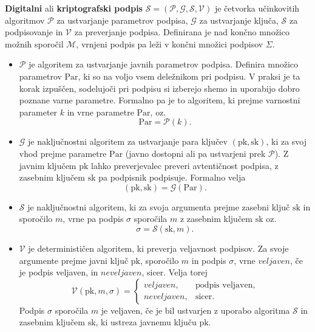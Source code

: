 \documentclass[isrm2, tisk]{fmfdelo}
\begin{document}
\begin{definicija}
\label{def:digisig}
    \textbf{Digitalni} ali \textbf{kriptografski podpis} $\mathcal{S} = (\mathcal{P}, \mathcal{G},
    \mathcal{S}, \mathcal{V})$ je četvorka učinkovitih algoritmov $\mathcal{P}$ za ustvarjanje parametrov
    podpisa, $\mathcal{G}$ za ustvarjanje ključa, $\mathcal{S}$ za podpisovanje in $\mathcal{V}$ za
    preverjanje podpisa. Definirana je nad končno množico možnih  sporočil $\mathcal{M}$, vrnjeni
    podpis pa leži v končni množici podpisov $\Sigma$.
    \begin{itemize}
        \item $\mathcal{P}$ je algoritem za ustvarjanje javnih parametrov podpisa. Definira množico
            parametrov $\text{Par}$, ki so na voljo vsem deležnikom pri podpisu. V praksi je ta korak izpuščen,
            sodelujoči pri podpisu si izberejo shemo in uporabijo dobro poznane varne parametre.
            Formalno pa je to algoritem, ki prejme varnostni parameter $k$ in vrne parametre
            $\text{Par}$, oz.\
            $$
            \text{Par} = \mathcal{P}(k).
            $$
        \item $\mathcal{G}$ je naključnostni algoritem za ustvarjanje para ključev $(\text{pk}, \text{sk})$, 
            ki za svoj vhod prejme parametre $\text{Par}$ (javno dostopni ali pa ustvarjeni prek $\mathcal{P}$).
            Z javnim ključem $\text{pk}$ lahko preverjevalec preveri avtentičnost podpisa, z zasebnim
            ključem $\text{sk}$ pa podpisnik podpisuje. Formalno velja
            $$
            (\text{pk}, \text{sk}) = \mathcal{G}(\text{Par}).
            $$
        \item $\mathcal{S}$ je naključnostni algoritem, ki za svoja argumenta prejme zasebni ključ $\text{sk}$
            in sporočilo $m$, vrne pa podpis $\sigma$ sporočila $m$ z zasebnim ključem $\text{sk}$
            oz.\
            $$
            \sigma = \mathcal{S}(\text{sk}, m).
            $$
        \item $\mathcal{V}$ je determinističen algoritem, ki preverja veljavnost podpisov. Za svoje argumente
            prejme javni ključ $\text{pk}$, sporočilo $m$ in podpis $\sigma$, vrne $veljaven$, če je podpis 
            veljaven, in $neveljaven$, sicer. Velja torej
            $$ 
            \mathcal{V}(\text{pk}, m, \sigma) =
            \begin{cases}
                veljaven, & \text{podpis veljaven}, \\
                neveljaven, & \text{sicer}.
            \end{cases}
            $$
            Podpis $\sigma$ sporočila $m$ je veljaven, če je bil ustvarjen z uporabo algoritma
            $\mathcal{S}$ in zasebnim ključem $\text{sk}$, ki ustreza javnemu ključu $\text{pk}$.
    \end{itemize}
\end{definicija}
\end{document}
